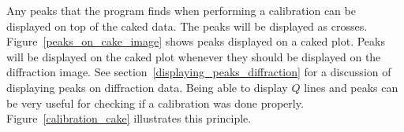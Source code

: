 Any peaks that the program finds when performing
a calibration can be displayed on top of the caked
data. The peaks will be displayed as crosses.
Figure~\ref{peaks_on_cake_image} shows peaks
displayed on a caked plot. Peaks will be displayed on 
the caked plot whenever they should be displayed on 
the diffraction image. See 
section~\ref{displaying_peaks_diffraction} for a
discussion of displaying peaks on diffraction data.
Being able to display $Q$ lines and peaks can
be very useful for checking if a calibration was 
done properly. Figure~\ref{calibration_cake} illustrates
this principle.

\begin{figure}[htb]
    \centering

\end{figure}
